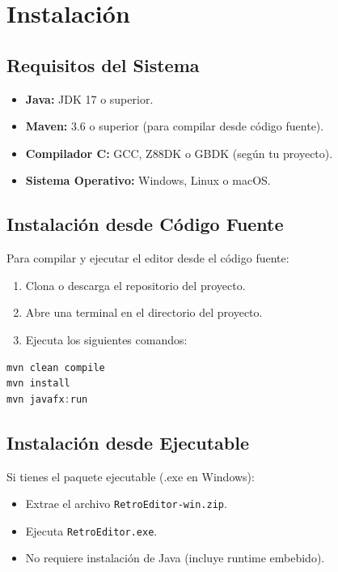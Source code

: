 \documentclass[../../main.tex]{subfiles}
\begin{document}
\clearpage

\section{Instalación}
\subsection{Requisitos del Sistema}
\begin{itemize}
    \item \textbf{Java:} JDK 17 o superior.
    \item \textbf{Maven:} 3.6 o superior (para compilar desde código fuente).
    \item \textbf{Compilador C:} GCC, Z88DK o GBDK (según tu proyecto).
    \item \textbf{Sistema Operativo:} Windows, Linux o macOS.
\end{itemize}

\subsection{Instalación desde Código Fuente}
Para compilar y ejecutar el editor desde el código fuente:
\begin{enumerate}
    \item Clona o descarga el repositorio del proyecto.
    \item Abre una terminal en el directorio del proyecto.
    \item Ejecuta los siguientes comandos:
\end{enumerate}

\begin{lstlisting}[language = Java]
mvn clean compile
mvn install
mvn javafx:run
\end{lstlisting}

\subsection{Instalación desde Ejecutable}
Si tienes el paquete ejecutable (.exe en Windows):
\begin{itemize}
    \item Extrae el archivo \lstinline|RetroEditor-win.zip|.
    \item Ejecuta \lstinline|RetroEditor.exe|.
    \item No requiere instalación de Java (incluye runtime embebido).
\end{itemize}
\end{document}
